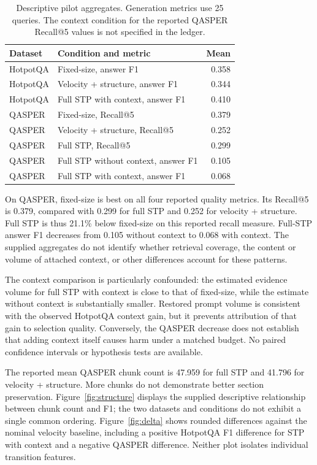 \documentclass[10pt]{article}
\begin{document}
\begin{table}[t]
\centering
\begin{tabular}{llr}
\toprule
Dataset & Condition and metric & Mean \\
\midrule
HotpotQA & Fixed-size, answer F1 & 0.358 \\
HotpotQA & Velocity + structure, answer F1 & 0.344 \\
HotpotQA & Full STP with context, answer F1 & 0.410 \\
\midrule
QASPER & Fixed-size, Recall@5 & 0.379 \\
QASPER & Velocity + structure, Recall@5 & 0.252 \\
QASPER & Full STP, Recall@5 & 0.299 \\
QASPER & Full STP without context, answer F1 & 0.105 \\
QASPER & Full STP with context, answer F1 & 0.068 \\
\bottomrule
\end{tabular}
\caption{Descriptive pilot aggregates. Generation metrics use 25 queries. The context condition for the reported QASPER Recall@5 values is not specified in the ledger.}
\label{tab:results}
\end{table}

On QASPER, fixed-size is best on all four reported quality metrics. Its Recall@5 is 0.379, compared with 0.299 for full STP and 0.252 for velocity + structure. Full STP is thus 21.1\% below fixed-size on this reported recall measure. Full-STP answer F1 decreases from 0.105 without context to 0.068 with context. The supplied aggregates do not identify whether retrieval coverage, the content or volume of attached context, or other differences account for these patterns.

The context comparison is particularly confounded: the estimated evidence volume for full STP with context is close to that of fixed-size, while the estimate without context is substantially smaller. Restored prompt volume is consistent with the observed HotpotQA context gain, but it prevents attribution of that gain to selection quality. Conversely, the QASPER decrease does not establish that adding context itself causes harm under a matched budget. No paired confidence intervals or hypothesis tests are available.

The reported mean QASPER chunk count is 47.959 for full STP and 41.796 for velocity + structure. More chunks do not demonstrate better section preservation. Figure~\ref{fig:structure} displays the supplied descriptive relationship between chunk count and F1; the two datasets and conditions do not exhibit a single common ordering. Figure~\ref{fig:delta} shows rounded differences against the nominal velocity baseline, including a positive HotpotQA F1 difference for STP with context and a negative QASPER difference. Neither plot isolates individual transition features.
\end{document}
